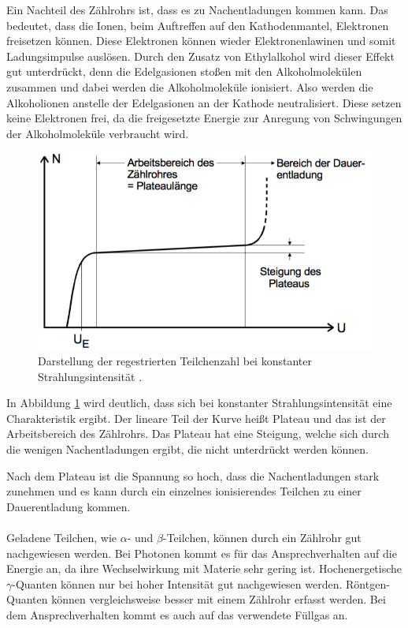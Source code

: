 Ein Nachteil des Zählrohrs ist, dass es zu Nachentladungen kommen kann. Das bedeutet,
dass die Ionen, beim Auftreffen auf den Kathodenmantel, Elektronen freisetzen können.
Diese Elektronen können wieder Elektronenlawinen und somit Ladungsimpulse auslösen.
Durch den Zusatz von Ethylalkohol wird dieser Effekt gut unterdrückt, denn die
Edelgasionen stoßen mit den Alkoholmolekülen zusammen und dabei werden die Alkoholmoleküle
ionisiert. Also werden die Alkoholionen anstelle der Edelgasionen an der Kathode neutralisiert.
Diese setzen keine Elektronen frei, da die freigesetzte Energie zur Anregung von Schwingungen
der Alkoholmoleküle verbraucht wird.

\begin{figure}[H]
  \centering
  \includegraphics[width=\textwidth]{content/Plateau.png}
  \caption{Darstellung der regestrierten Teilchenzahl bei konstanter Strahlungsintensität
  \cite{1}.}
  \label{abb:4}
\end{figure}

In Abbildung \ref{abb:4} wird deutlich, dass sich bei konstanter Strahlungsintensität
eine Charakteristik ergibt. Der lineare Teil der Kurve heißt Plateau und das ist der
Arbeitsbereich des Zählrohrs. Das Plateau hat eine Steigung, welche sich durch die wenigen
Nachentladungen ergibt, die nicht unterdrückt werden können.

Nach dem Plateau ist die Spannung so hoch, dass die Nachentladungen stark zunehmen
und es kann durch ein einzelnes ionisierendes Teilchen zu einer Dauerentladung kommen.
\\\\

Geladene Teilchen, wie $\alpha$- und $\beta$-Teilchen, können durch ein Zählrohr
gut nachgewiesen werden. Bei Photonen kommt es für das Ansprechverhalten auf die
Energie an, da ihre Wechselwirkung mit Materie sehr gering ist. Hochenergetische
$\gamma$-Quanten können nur bei hoher Intensität gut nachgewiesen werden. Röntgen-Quanten
können vergleichsweise besser mit einem Zählrohr erfasst werden. Bei dem Ansprechverhalten
kommt es auch auf das verwendete Füllgas an.
